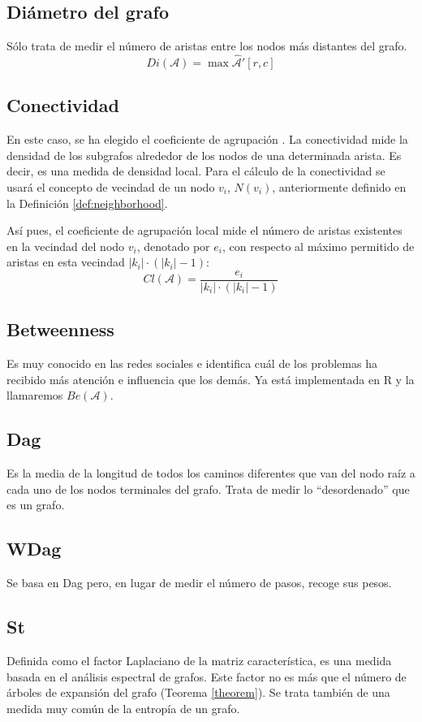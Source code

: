 \subsection{Diámetro del grafo}
Sólo trata de medir el número de aristas entre los nodos más distantes del grafo.
\begin{equation}
Di(\mathcal{A}) = \max{\hat{\mathcal{A}}'[r,c]}
\end{equation}
\subsection{Conectividad}
En este caso, se ha elegido el coeficiente de agrupación \cite{cormen2022introduction}. La conectividad mide la densidad de los subgrafos alrededor de los nodos de una determinada arista. Es decir, es una medida de densidad local. Para el cálculo de la conectividad se usará el concepto de vecindad de un nodo $v_i$, $N(v_i)$, anteriormente definido en la Definición \ref{def:neighborhood}.

Así pues, el coeficiente de agrupación local mide el número de aristas existentes en la vecindad del nodo $v_i$, denotado por $e_i$, con respecto al máximo permitido de aristas en esta vecindad $|k_i| \cdot (|k_i| - 1)$:
\begin{equation}
Cl(\mathcal{A}) = \frac{e_i}{|k_i| \cdot (|k_i| - 1)}
\end{equation}
\subsection{Betweenness}
Es muy conocido en las redes sociales e identifica cuál de los problemas ha recibido más atención e influencia que los demás. Ya está implementada en R y la llamaremos $Be(\mathcal{A})$.
\subsection{Dag}
Es la media de la longitud de todos los caminos diferentes que van del nodo raíz a cada uno de los nodos terminales del grafo. Trata de medir lo ``desordenado'' que es un grafo.
\subsection{WDag}
Se basa en Dag pero, en lugar de medir el número de pasos, recoge sus pesos.
\subsection{St}
Definida como el factor Laplaciano de la matriz característica, es una medida basada en el análisis espectral de grafos. Este factor no es más que el número de árboles de expansión del grafo (Teorema \ref{theorem}). Se trata también de una medida muy común de la entropía de un grafo.

